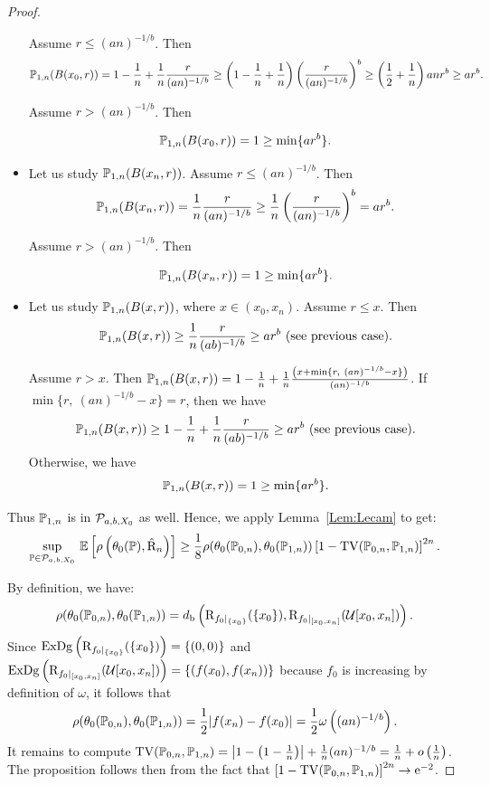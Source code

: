 \begin{proof}
\begin{itemize}
Assume $r\leq (an)^{-1/b}$.
Then $$\mathbb{P}_{1,n}(B(x_0,r))=1-\frac 1 n + \frac 1 n \frac{r}{(an)^{-1/b}}\geq \left(1 -\frac 1 n + \frac 1 n\right)\left(\frac{r}{(an)^{-1/b}}\right)^b
\geq\left(\frac 1 2+\frac 1 n\right)anr^b\geq ar^b.$$

Assume $r > (an)^{-1/b}$. Then

$$\mathbb{P}_{1,n}(B(x_0,r))=1\geq \min\{ar^b\}.$$

\item Let us study $\mathbb{P}_{1,n}(B(x_n,r))$. 
Assume $r\leq (an)^{-1/b}$.
Then $$\mathbb{P}_{1,n}(B(x_n,r))=\frac 1 n \frac{r}{(an)^{-1/b}}\geq \frac 1 n \left(\frac{r}{(an)^{-1/b}}\right)^b=ar^b.$$

Assume $r > (an)^{-1/b}$. Then

$$\mathbb{P}_{1,n}(B(x_n,r))=1\geq \min\{ar^b\}.$$

\item Let us study $\mathbb{P}_{1,n}(B(x,r))$, where $x\in(x_0,x_n)$. 
Assume $r\leq x$. Then
$$\mathbb{P}_{1,n}(B(x,r))\geq \frac 1 n\frac{r}{(ab)^{-1/b}}\geq ar^b\text{ (see previous case)}.$$

Assume $r > x$. Then 
$\mathbb{P}_{1,n}(B(x,r))=1-\frac 1 n + \frac 1 n \frac{\left(x+\min\{r,\ (an)^{-1/b}-x\}\right)}{(an)^{-1/b}}$. If 
$\min\{r,\ (an)^{-1/b}-x\}=r$, then we have 
$$\mathbb{P}_{1,n}(B(x,r))\geq 1-\frac 1 n + \frac 1 n\frac{r}{(ab)^{-1/b}}\geq ar^b\text{ (see previous case)}.$$
Otherwise, we have
$$\mathbb{P}_{1,n}(B(x,r))=1\geq \min\{ar^b\}.$$
\end{itemize}

Thus $\mathbb{P}_{1,n}$ is in $\mathcal P_{a,b,X_0}$ as well.
Hence, we apply Lemma~\ref{Lem:Lecam} to get:
$$\underset{\mathbb{P}\in\mathcal{P}_{a,b,X_0}}{\rm sup}\  \mathbb{E}\left[\rho\left(\theta_0(\mathbb{P}),{\hat {\mathrm{R}}}_n \right)\right]
\geq \frac 1 8 \rho(\theta_0(\mathbb{P}_{0,n}),\theta_0(\mathbb{P}_{1,n}))\left[1-{\rm TV}(\mathbb{P}_{0,n},\mathbb{P}_{1,n})\right]^{2n}.$$

By definition, we have:
$$\rho(\theta_0(\mathbb{P}_{0,n}),\theta_0(\mathbb{P}_{1,n}))=d_{\rm b}\left(\mathrm{R}_{f_0|_{\{x_0\}}}(\{x_0\}), \mathrm{R}_{f_0|_{[x_0,x_n]}}(\mathcal{U}[x_0,x_n])\right).$$
Since $\mathrm{ExDg}\left(\mathrm{R}_{f_0|_{\{x_0\}}}(\{x_0\})\right)=\{(0,0)\}$ and $\mathrm{ExDg}\left(\mathrm{R}_{f_0|_{[x_0,x_n]}}(\mathcal{U}[x_0,x_n])\right)=\{(f(x_0),f(x_n))\}$
because $f_0$ is increasing by definition of $\omega$, it follows that 
$$\rho(\theta_0(\mathbb{P}_{0,n}),\theta_0(\mathbb{P}_{1,n}))=\frac 1 2 |f(x_n)-f(x_0)|=\frac 1 2 \omega\left((an)^{-1/b}\right).$$
It remains to compute ${\rm TV}(\mathbb{P}_{0,n},\mathbb{P}_{1,n})=\left|1-\left(1-\frac 1 n\right)\right|+\frac 1 n (an)^{-1/b}=\frac 1 n + o\left(\frac 1 n\right)$.
The proposition follows then from the fact that $\left[1-{\rm TV}(\mathbb{P}_{0,n},\mathbb{P}_{1,n})\right]^{2n}\rightarrow {\rm e}^{-2}$.
\end{proof}

